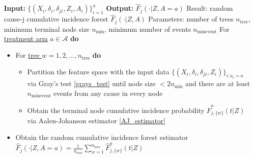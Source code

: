 \begin{algorithm}[H]
  \caption{The random cumulative incidence forest estimator}
  \label{alg:RCIF}
  \begin{flushleft}
    \begin{algorithmic}
  \State \textbf{Input:} $\{(X_i, \delta_i, \delta_{ji}, Z_i, A_i)\}_{i=1}^n$
  \State \textbf{Output:} $\widehat{F}_j(\cdot|Z,A=a)$
  \State Result: random cause-j cumulative incidence forest $\widehat{F}_j(\cdot|Z,A)$
  \State Parameters: number of trees $n_{\text{tree}}$, minimum terminal node size $n_{\text{min}}$, minimum number of events $n_{\text{minevent}}$
  \State For \underline{treatment arm} $a \in \mathcal{A}$ \textbf{do} 
  \begin{itemize}[label={}]
  \item For \underline{tree $w = 1, 2, \ldots, n_{\text{tree}}$} \textbf{do}
  \begin{itemize}[label={}]
  \item Partition the feature space with the input data $\{(X_i, \delta_i, \delta_{ji}, Z_i)\}_{i:a_i=a}$ via Gray's test \cref{grays_test} until node size $< 2n_{\text{min}}$ and there are at least $n_{\text{minevent}}$ events from any cause in every node
  \item Obtain the terminal node cumulative incidence probability $\widehat{F}^a_{j,\{w\}}(t | Z)$ via Aalen-Johanson estimator \cref{AJ_estimator}
  \end{itemize}
  
  \item Obtain the random cumulative incidence forest estimator $\widehat{F}_j(\cdot | Z, A = a) = \frac{1}{n_{\text{tree}}} \sum_{w=1}^{n_\text{tree}} \widehat{F}_{j,\{w\}}^{a}(t | Z)$
  \end{itemize}
\end{algorithmic}
\end{flushleft}
\end{algorithm}